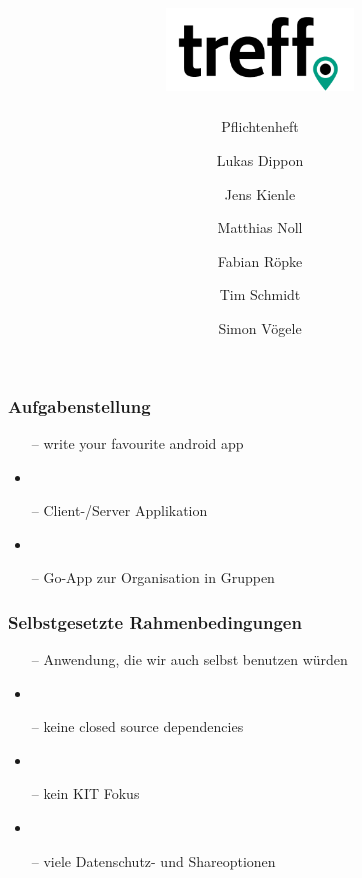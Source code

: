 \documentclass[aspectratio=1610]{beamer}
\title{\includegraphics[width = 50mm]{images/logo_crop.png}}
\subtitle{\huge Pflichtenheft}
\author{Lukas Dippon
	\and Jens Kienle
	\and Matthias Noll
	\and Fabian Röpke
	\and Tim Schmidt
	\and Simon Vögele}
\begin{document}
	\begin{frame}[plain]
	\maketitle
	\end{frame}

	\begin{frame}[plain]
		\frametitle{Aufgabenstellung}
		\begin{itemize}
			\item[--] write your favourite android app
			\item
			\item [--]Client-/Server Applikation
			\item
			\item[--] Go-App zur Organisation in Gruppen
		\end{itemize}
	\end{frame}

	\begin{frame}[plain]
		\frametitle{Selbstgesetzte Rahmenbedingungen}
		\begin{itemize}
			\item[--] Anwendung, die wir auch  selbst benutzen würden
			\item
			\item[--] keine closed source dependencies
			\item
			\item [--]kein KIT Fokus
			\item
			\item [--]viele Datenschutz- und Shareoptionen
		\end{itemize}
	\end{frame}
\end{document}
